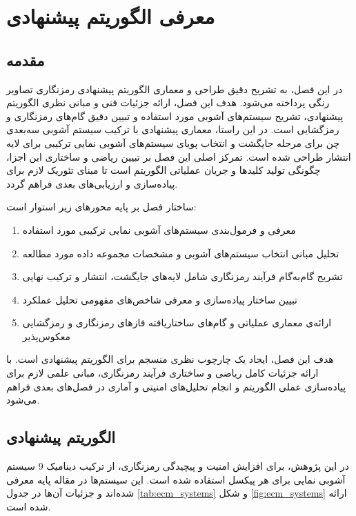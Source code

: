 
\chapter{معرفی الگوریتم پیشنهادی}

\section{مقدمه}
در این فصل، به تشریح دقیق طراحی و معماری الگوریتم پیشنهادی رمزنگاری تصاویر رنگی پرداخته می‌شود. هدف این فصل، ارائه جزئیات فنی و مبانی نظری الگوریتم پیشنهادی، تشریح سیستم‌های آشوبی مورد استفاده و تبیین دقیق گام‌های رمزنگاری و رمزگشایی است. در این راستا، معماری پیشنهادی با ترکیب سیستم آشوبی سه‌بعدی چن برای مرحله جایگشت و انتخاب پویای سیستم‌های آشوبی نمایی ترکیبی برای لایه انتشار طراحی شده است. تمرکز اصلی این فصل بر تبیین ریاضی و ساختاری این اجزا، چگونگی تولید کلیدها و جریان عملیاتی الگوریتم است تا مبنای تئوریک لازم برای پیاده‌سازی و ارزیابی‌های بعدی فراهم گردد.

ساختار فصل بر پایه محورهای زیر استوار است:
\begin{enumerate}
    \item معرفی و فرمول‌بندی سیستم‌های آشوبی نمایی ترکیبی مورد استفاده
    \item تحلیل مبانی انتخاب سیستم‌های آشوبی و مشخصات مجموعه داده مورد مطالعه
    \item تشریح گام‌به‌گام فرآیند رمزنگاری شامل لایه‌های جایگشت، انتشار و ترکیب نهایی
    \item تبیین ساختار پیاده‌سازی و معرفی شاخص‌های مفهومی تحلیل عملکرد
    \item ارائه‌ی معماری عملیاتی و گام‌های ساختاریافته فازهای رمزنگاری و رمزگشایی معکوس‌پذیر
\end{enumerate}

هدف این فصل، ایجاد یک چارچوب نظری منسجم برای الگوریتم پیشنهادی است. با ارائه جزئیات کامل ریاضی و ساختاری فرآیند رمزنگاری، مبانی علمی لازم برای پیاده‌سازی عملی الگوریتم و انجام تحلیل‌های امنیتی و آماری در فصل‌های بعدی فراهم می‌شود.

\section{الگوریتم پیشنهادی}
در این پژوهش، برای افزایش امنیت و پیچیدگی رمزنگاری، از ترکیب دینامیک 9 سیستم آشوبی نمایی برای هر پیکسل استفاده شده است. این سیستم‌ها در مقاله پایه \cite{ref4} معرفی شده‌اند و جزئیات آن‌ها در جدول \ref{tab:ecm_systems} و شکل \ref{fig:ecm_systems} ارائه شده است.

